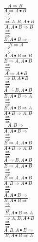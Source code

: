 \documentclass[11pt]{article}
\begin{document}
\begin{center}
\bigskip
\\$\frac{A\Rightarrow B}{A\Rightarrow A\bullet B}$
\bigskip
\\$\frac{\Rightarrow }{\Rightarrow }$
\bigskip
\\$\frac{\Rightarrow A, B, A\bullet B}{A, A\bullet B\Rightarrow B}$
\bigskip
\\$\frac{\Rightarrow }{\Rightarrow }$
\bigskip
\\$\frac{B, A\bullet B\Rightarrow }{B\Rightarrow A}$
\bigskip
\\$\frac{\Rightarrow }{\Rightarrow }$
\bigskip
\\$\frac{A, A\bullet B\Rightarrow B}{B\Rightarrow A, A\bullet B}$
\bigskip
\\$\frac{\Rightarrow }{\Rightarrow }$
\bigskip
\\$\frac{A\Rightarrow A\bullet B}{\Rightarrow B, A\bullet B}$
\bigskip
\\$\frac{\Rightarrow }{\Rightarrow }$
\bigskip
\\$\frac{A\Rightarrow B, A\bullet B}{B, A\bullet B\Rightarrow A}$
\bigskip
\\$\frac{\Rightarrow }{\Rightarrow }$
\bigskip
\\$\frac{B, A\bullet B\Rightarrow A}{A\bullet B\Rightarrow A, B}$
\bigskip
\\$\frac{\Rightarrow }{\Rightarrow }$
\bigskip
\\$\frac{A, B\Rightarrow }{A, A\bullet B\Rightarrow }$
\bigskip
\\$\frac{\Rightarrow }{\Rightarrow }$
\bigskip
\\$\frac{B\Rightarrow A, A\bullet B}{A\bullet B\Rightarrow A, B}$
\bigskip
\\$\frac{\Rightarrow }{\Rightarrow }$
\bigskip
\\$\frac{A\Rightarrow B, A\bullet B}{B\Rightarrow A, A\bullet B}$
\bigskip
\\$\frac{\Rightarrow }{\Rightarrow }$
\bigskip
\\$\frac{B\Rightarrow A, A\bullet B}{A, B\Rightarrow A\bullet B}$
\bigskip
\\$\frac{\Rightarrow }{\Rightarrow }$
\bigskip
\\$\frac{A, A\bullet B\Rightarrow }{B, A\bullet B\Rightarrow }$
\bigskip
\\$\frac{\Rightarrow }{\Rightarrow }$
\bigskip
\\$\frac{B, A\bullet B\Rightarrow A}{\Rightarrow A, B, A\bullet B}$
\bigskip
\\$\frac{\Rightarrow }{\Rightarrow }$
\bigskip
\\$\frac{A, B, A\bullet B\Rightarrow }{B, A\bullet B\Rightarrow A}$

\end{center}
\end{document}
